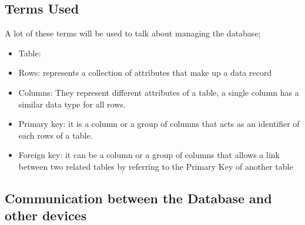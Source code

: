 \subsection{Terms Used}
A lot of these terms will be used to talk about managing the database;

\begin{itemize}
  \item Table: 
  \item Rows: represents a collection of attributes that make up a data record 
  \item Columns: They represent different attributes of a table, a single column has a similar data type for all rows.
  \item Primary key: it is a column or a group of columns that acts as an identifier of each rows of a table.
  \item Foreign key: it can be a column or a group of columns that allows a link between two related tables by referring to the Primary Key of another table
\end{itemize}

\subsection{Communication between the Database and other devices}




